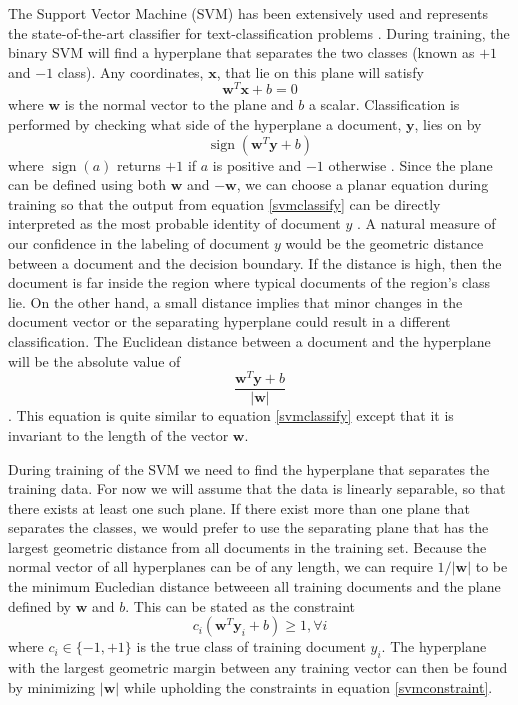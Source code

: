 The Support Vector Machine (SVM) has been extensively used and represents the state-of-the-art classifier for text-classification problems \cite[319]{information}. During training, the binary SVM will find a hyperplane that separates the two classes (known as $+1$ and $-1$ class). Any coordinates, $\mathbf{x}$, that lie on this plane will satisfy
\begin{equation*}
\mathbf{w}^T\mathbf{x}+b=0
\end{equation*}
where $\mathbf{w}$ is the normal vector to the plane and $b$ a scalar. Classification is performed by checking what side of the hyperplane a document, $\mathbf{y}$, lies on by
\begin{equation}
\label{svmclassify}
\operatorname{sign}(\mathbf{w}^T\mathbf{y}+b)
\end{equation}
where $\operatorname{sign}(a)$ returns $+1$ if $a$ is positive and $-1$ otherwise \cite[322]{information}. Since the plane can be defined using both $\mathbf{w}$ and $-\mathbf{w}$, we can choose a planar equation during training so that the output from equation \ref{svmclassify} can be directly interpreted as the most probable identity of document $y$ . A natural measure of our confidence in the labeling of document $y$ would be the geometric distance between a document and the decision boundary. If the distance is high, then the document is far inside the region where typical documents of the region's class lie. On the other hand, a small distance implies that minor changes in the document vector or the separating hyperplane could result in a different classification. The Euclidean distance between a document and the hyperplane will be the absolute value of 
\begin{equation}
\label{svmeucdist}
\frac{\mathbf{w}^T\mathbf{y}+b}{|\mathbf{w}|}
\end{equation}
\cite[p. 323]{information}. This equation is quite similar to equation \ref{svmclassify} except that it is invariant to the length of the vector $\mathbf{w}$.

During training of the SVM we need to find the hyperplane that separates the training data. For now we will assume that the data is linearly separable, so that there exists at least one such plane. If there exist more than one plane that separates the classes, we would prefer to use the separating plane that has the largest geometric distance from all documents in the training set. Because the normal vector of all hyperplanes can be of any length, we can require $1/|\mathbf{w}|$ to be the minimum Eucledian distance betweeen all training documents and the plane defined by $\mathbf{w}$ and $b$. This can be stated as the constraint \cite[p. 324]{information}
\begin{equation}
\label{svmconstraint}
c_i(\mathbf{w}^T\mathbf{y}_i+b) \geq 1, \forall i
\end{equation}
where $c_i \in \{ -1, +1 \}$ is the true class of training document $y_i$. The hyperplane with the largest geometric margin between any training vector can then be found by minimizing $|\mathbf{w}|$ while upholding the constraints in equation \ref{svmconstraint}.

